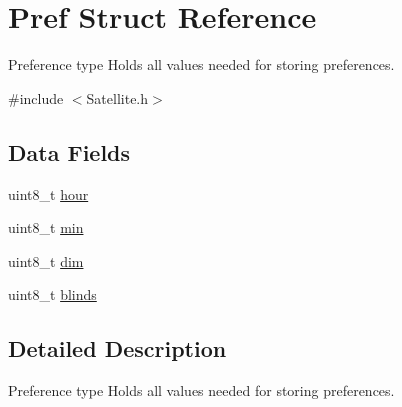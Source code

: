 \hypertarget{struct_pref}{\section{Pref Struct Reference}
\label{struct_pref}
}


Preference type Holds all values needed for storing preferences.  




{\ttfamily \#include $<$Satellite.\-h$>$}

\subsection*{Data Fields}
\begin{DoxyCompactItemize}
\item 
uint8\-\_\-t \hyperlink{struct_pref_ae5af4ff48939d13d480f87e56a9385d6}{hour}
\item 
uint8\-\_\-t \hyperlink{struct_pref_ac9b481208b43f7c37ed25e446bdec692}{min}
\item 
uint8\-\_\-t \hyperlink{struct_pref_acd6b0c9d182822b4646f744da608eb78}{dim}
\item 
uint8\-\_\-t \hyperlink{struct_pref_ad1733fa682379b1821f819f56447c66a}{blinds}
\end{DoxyCompactItemize}


\subsection{Detailed Description}
Preference type Holds all values needed for storing preferences. 

